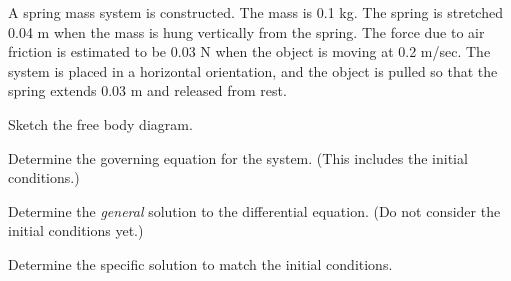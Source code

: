 


  \begin{problem}

  \item A spring mass system is constructed. The mass is 0.1 kg. The
    spring is stretched 0.04 m when the mass is hung vertically from
    the spring. The force due to air friction is estimated to be 0.03
    N when the object is moving at 0.2 m/sec. The system is placed in
    a horizontal orientation, and the object is pulled so that the
    spring extends 0.03 m and released from rest.

    \begin{subproblem}
      \item Sketch the free body diagram.
        \vspace{4em}

      \item Determine the governing equation for the system. (This
        includes the initial conditions.)
        \vfill


      \item Determine the \textit{general} solution to the differential
        equation. (Do not consider the initial conditions yet.)
        \vfill

        \clearpage

      \item Determine the specific solution to match the initial conditions.

        \vfill

    \end{subproblem}



  \end{problem}





